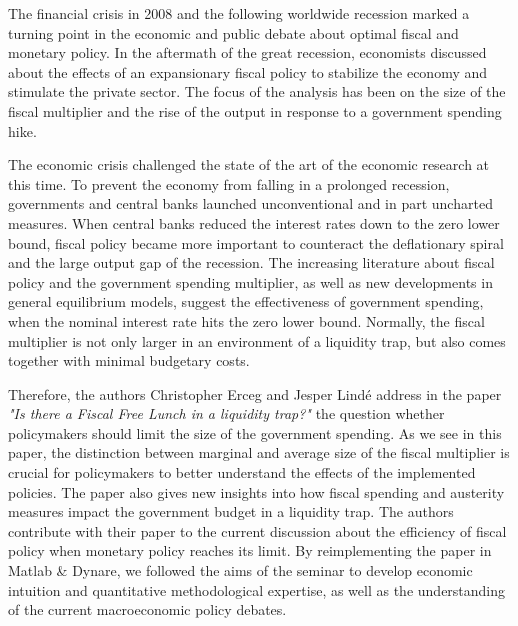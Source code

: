\documentclass[12pt,a4paper,oneside,titlepage]{article}
\begin{document}
The financial crisis in 2008 and the following worldwide recession marked a turning point in the economic and public debate about optimal fiscal and monetary policy. In the aftermath of the great recession, economists discussed about the effects of an expansionary fiscal policy to stabilize the economy and stimulate the private sector. The focus of the analysis has been on the size of the fiscal multiplier and the rise of the output in response to a government spending hike.
\par
\bigskip
The economic crisis challenged the state of the art of the economic research at this time. To prevent the economy from falling in a prolonged recession, governments and central banks launched unconventional and in part uncharted measures. When central banks reduced the interest rates down to the zero lower bound, fiscal policy became more important to counteract the deflationary spiral and the large output gap of the recession. The increasing literature about fiscal policy and the government spending multiplier, as well as new developments in general equilibrium models, suggest the effectiveness of government spending, when the nominal interest rate hits the zero lower bound. Normally, the fiscal multiplier is not only larger in an environment of a liquidity trap, but also comes together with minimal budgetary costs.
\par
\bigskip
Therefore, the authors Christopher Erceg and Jesper Lindé address in the paper \textit{"Is there a Fiscal Free Lunch in a liquidity trap?"} the question whether policymakers should limit the size of the government spending. As we see in this paper, the distinction between marginal and average size of the fiscal multiplier is crucial for policymakers to better understand the effects of the implemented policies. The paper also gives new insights into how fiscal spending and austerity measures impact the government budget in a liquidity trap. The authors contribute with their paper to the current discussion about the efficiency of fiscal policy when monetary policy reaches its limit. By reimplementing the paper in Matlab \& Dynare, we followed the aims of the seminar to develop economic intuition and quantitative
methodological expertise, as well as the understanding of the current macroeconomic policy debates.
\par
\bigskip
\end{document}
